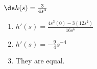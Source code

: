 {$\ds h(s)= \frac{3}{4s^3}$
}
{\begin{enumerate}
\item		$h'(s) = \frac{4s^3(0) - 3(12s^2)}{16s^6}$
\item		$h'(s) = -\frac94 s^{-4}$
\item		They are equal.
\end{enumerate}
}
